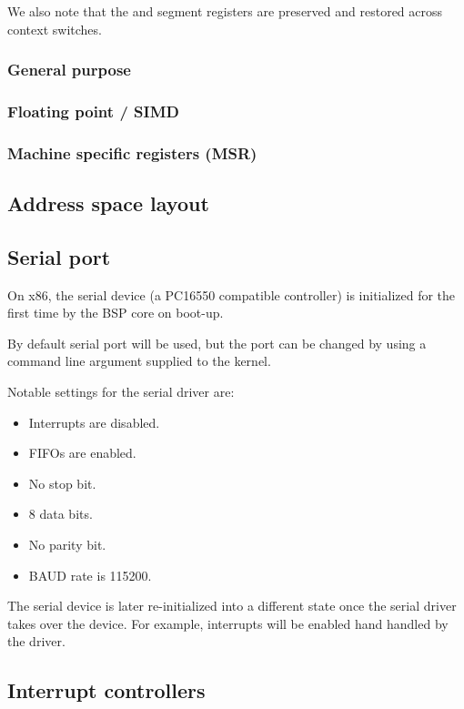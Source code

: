 \documentclass[a4paper,11pt,twoside]{report}
\begin{document}
{{We also note that the  and  segment registers are
preserved and restored across context switches.

\subsubsection{General purpose}

\subsubsection{Floating point / SIMD}

\subsubsection{Machine specific registers (MSR)}

\subsection{Address space layout}

\subsection{Serial port}
On x86, the serial device (a PC16550 compatible controller) is initialized for the first time by the BSP core on boot-up.

By default serial port  will be used, but the port can be changed by
using a command line argument supplied to the kernel.

Notable settings for the serial driver are:
\begin{itemize}
    \item Interrupts are disabled.
    \item FIFOs are enabled.
    \item No stop bit.
    \item 8 data bits.
    \item No parity bit.
    \item BAUD rate is 115200.
\end{itemize}

The serial device is later re-initialized into a different state once the
serial driver takes over the device. For example, interrupts will be enabled
hand handled by the driver.


\subsection{Interrupt controllers}

}}
\end{document}
